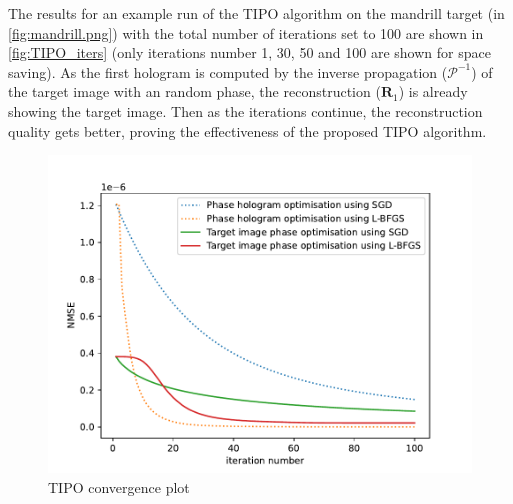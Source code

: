 The results for an example run of the TIPO algorithm on the mandrill target (in \cref{fig:mandrill.png}) with the total number of iterations set to 100 are shown in \cref{fig:TIPO_iters} (only iterations number 1, 30, 50 and 100 are shown for space saving). As the first hologram is computed by the inverse propagation ($\mathcal{P}^{-1}$) of the target image with an random phase, the reconstruction ($\textbf{R}_1$) is already showing the target image. Then as the iterations continue, the reconstruction quality gets better, proving the effectiveness of the proposed TIPO algorithm.

\begin{figure}[H]
	\centering
	\includegraphics[width=\textwidth]{TIPO_convergence.pdf}
	\caption{TIPO convergence plot}
	\label{fig:TIPO_convergence}
\end{figure}

